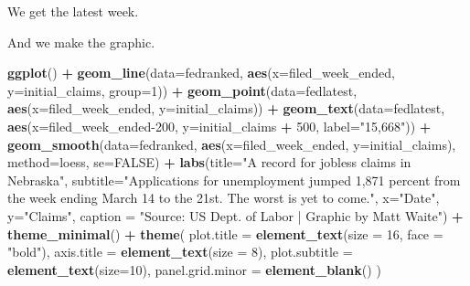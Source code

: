 \documentclass[]{book}
\newenvironment{Shaded}{\begin{snugshade}}{\end{snugshade}}
\newcommand{\DataTypeTok}[1]{\textcolor[rgb]{0.13,0.29,0.53}{#1}}
\newcommand{\DecValTok}[1]{\textcolor[rgb]{0.00,0.00,0.81}{#1}}
\newcommand{\KeywordTok}[1]{\textcolor[rgb]{0.13,0.29,0.53}{\textbf{#1}}}
\newcommand{\NormalTok}[1]{#1}
\newcommand{\OperatorTok}[1]{\textcolor[rgb]{0.81,0.36,0.00}{\textbf{#1}}}
\newcommand{\OtherTok}[1]{\textcolor[rgb]{0.56,0.35,0.01}{#1}}
\newcommand{\StringTok}[1]{\textcolor[rgb]{0.31,0.60,0.02}{#1}}
\begin{document}
We get the latest week.

\begin{Shaded}
\end{Shaded}

And we make the graphic.

\begin{Shaded}
\begin{Highlighting}[]
\KeywordTok{ggplot}\NormalTok{() }\OperatorTok{+}\StringTok{ }
\StringTok{  }\KeywordTok{geom_line}\NormalTok{(}\DataTypeTok{data=}\NormalTok{fedranked, }\KeywordTok{aes}\NormalTok{(}\DataTypeTok{x=}\NormalTok{filed_week_ended, }\DataTypeTok{y=}\NormalTok{initial_claims, }\DataTypeTok{group=}\DecValTok{1}\NormalTok{)) }\OperatorTok{+}
\StringTok{  }\KeywordTok{geom_point}\NormalTok{(}\DataTypeTok{data=}\NormalTok{fedlatest, }\KeywordTok{aes}\NormalTok{(}\DataTypeTok{x=}\NormalTok{filed_week_ended, }\DataTypeTok{y=}\NormalTok{initial_claims)) }\OperatorTok{+}\StringTok{ }
\StringTok{  }\KeywordTok{geom_text}\NormalTok{(}\DataTypeTok{data=}\NormalTok{fedlatest, }\KeywordTok{aes}\NormalTok{(}\DataTypeTok{x=}\NormalTok{filed_week_ended}\DecValTok{-200}\NormalTok{, }\DataTypeTok{y=}\NormalTok{initial_claims }\OperatorTok{+}\StringTok{ }\DecValTok{500}\NormalTok{, }\DataTypeTok{label=}\StringTok{"15,668"}\NormalTok{)) }\OperatorTok{+}\StringTok{ }
\StringTok{  }\KeywordTok{geom_smooth}\NormalTok{(}\DataTypeTok{data=}\NormalTok{fedranked, }\KeywordTok{aes}\NormalTok{(}\DataTypeTok{x=}\NormalTok{filed_week_ended, }\DataTypeTok{y=}\NormalTok{initial_claims), }\DataTypeTok{method=}\NormalTok{loess, }\DataTypeTok{se=}\OtherTok{FALSE}\NormalTok{) }\OperatorTok{+}\StringTok{ }
\StringTok{  }\KeywordTok{labs}\NormalTok{(}\DataTypeTok{title=}\StringTok{"A record for jobless claims in Nebraska"}\NormalTok{, }\DataTypeTok{subtitle=}\StringTok{"Applications for unemployment jumped 1,871 percent from the week ending March 14 to the 21st. The worst is yet to come."}\NormalTok{, }\DataTypeTok{x=}\StringTok{"Date"}\NormalTok{, }\DataTypeTok{y=}\StringTok{"Claims"}\NormalTok{, }\DataTypeTok{caption =} \StringTok{"Source: US Dept. of Labor  |  Graphic by Matt Waite"}\NormalTok{) }\OperatorTok{+}
\StringTok{  }\KeywordTok{theme_minimal}\NormalTok{() }\OperatorTok{+}\StringTok{ }
\StringTok{  }\KeywordTok{theme}\NormalTok{(}
    \DataTypeTok{plot.title =} \KeywordTok{element_text}\NormalTok{(}\DataTypeTok{size =} \DecValTok{16}\NormalTok{, }\DataTypeTok{face =} \StringTok{"bold"}\NormalTok{),}
    \DataTypeTok{axis.title =} \KeywordTok{element_text}\NormalTok{(}\DataTypeTok{size =} \DecValTok{8}\NormalTok{), }
    \DataTypeTok{plot.subtitle =} \KeywordTok{element_text}\NormalTok{(}\DataTypeTok{size=}\DecValTok{10}\NormalTok{), }
    \DataTypeTok{panel.grid.minor =} \KeywordTok{element_blank}\NormalTok{()}
\NormalTok{    )}
\end{Highlighting}
\end{Shaded}
\end{document}
